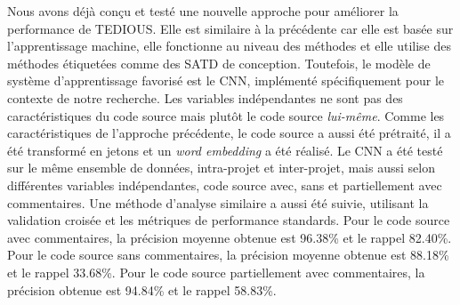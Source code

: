 Nous avons d\'{e}j\`{a} con\c{c}u et test\'{e} une nouvelle approche pour am\'{e}liorer la performance de \ac{TEDIOUS}. Elle est similaire \`{a} la pr\'{e}c\'{e}dente car elle est bas\'{e}e sur l'apprentissage machine, elle fonctionne au niveau des m\'{e}thodes et elle utilise des m\'{e}thodes \'{e}tiquet\'{e}es comme des \ac{SATD} de conception. Toutefois, le mod\`{e}le de syst\`{e}me d'apprentissage favoris\'{e} est le \ac{CNN}, impl\'{e}ment\'{e} sp\'{e}cifiquement pour le contexte de notre recherche. Les variables ind\'{e}pendantes ne sont pas des caract\'{e}ristiques du code source mais plut\^{o}t le code source \emph{lui-m\^{e}me}. Comme les caract\'{e}ristiques de l'approche pr\'{e}c\'{e}dente, le code source a aussi \'{e}t\'{e} pr\'{e}trait\'{e}, il a \'{e}t\'{e} transform\'{e} en jetons et un \emph{word embedding} a \'{e}t\'{e} r\'{e}alis\'{e}. Le \ac{CNN} a \'{e}t\'{e} test\'{e} sur le m\^{e}me ensemble de donn\'{e}es, intra-projet et inter-projet, mais aussi selon diff\'{e}rentes variables ind\'{e}pendantes, code source avec, sans et partiellement avec commentaires. Une m\'{e}thode d'analyse similaire a aussi \'{e}t\'{e} suivie, utilisant la validation crois\'{e}e et les m\'{e}triques de performance standards. Pour le code source avec commentaires, la pr\'{e}cision moyenne obtenue est 96.38\% et le rappel 82.40\%. Pour le code source sans commentaires, la pr\'{e}cision moyenne obtenue est 88.18\% et le rappel 33.68\%. Pour le code source partiellement avec commentaires, la pr\'{e}cision obtenue est 94.84\% et le rappel 58.83\%.



